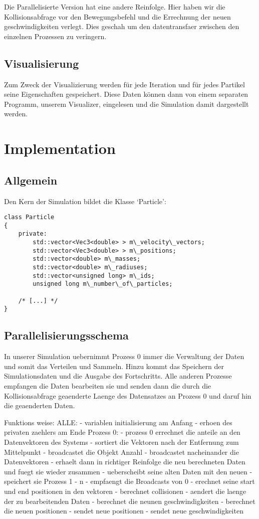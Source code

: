 Die Parallelisierte Version hat eine andere Reinfolge.
Hier haben wir die Kollisionsabfrage vor den Bewegungsbefehl und die Errechnung
der neuen geschwindigkeiten verlegt. Dies geschah um den datentransfaer zwischen
den einzelnen Prozessen zu veringern.

\subsection{Visualisierung}
Zum Zweck der Visualizierung werden für jede Iteration und für jedes Partikel seine
Eigenschaften gespeichert. Diese Daten können dann von einem separaten Programm,
unserem Visualizer, eingelesen und die Simulation damit dargestellt werden.


\section{Implementation}
\subsection{Allgemein}
Den Kern der Simulation bildet die Klasse `Particle':
\begin{verbatim}
class Particle
{
    private:
        std::vector<Vec3<double> > m\_velocity\_vectors;
        std::vector<Vec3<double> > m\_positions;
        std::vector<double> m\_masses;
        std::vector<double> m\_radiuses;
        std::vector<unsigned long> m\_ids;
        unsigned long m\_number\_of\_particles;

    /* [...] */
}
\end{verbatim}

\subsection{Parallelisierungsschema}
In unserer Simulation uebernimmt Prozess 0 immer die Verwaltung der Daten und somit das Verteilen
und Sammeln. Hinzu kommt das Speichern der Simulationsdaten und die Ausgabe des Fortschritts.
Alle anderen Prozesse empfangen die Daten bearbeiten sie und senden dann die
durch die Kollisionsabfrage geaenderte Laenge des Datensatzes an Prozess 0
und daruf hin die geaenderten Daten.

Funktions weise:
   ALLE:
       - variablen initialisierung am Anfang
       - erhoen des privaten zaehlers am Ende
   Prozess 0:
       - prozess 0 errechnet die anteile an den Datenvektoren des Systems
       - sortiert die Vektoren nach der Entfernung zum Mittelpunkt 
       - broadcastet die Objekt Anzahl
       - broadcastet nacheinander die Datenvektoren
       - erhaelt dann in richtiger Reinfolge die neu berechneten Daten und fuegt sie wieder zusammen
       - ueberscheibt seine alten Daten mit den neuen
       - speichert sie
   Prozess 1 - n
       - empfaengt die Broadcasts von 0
       - erechnet seine start und end positionen in den vektoren
       - berechnet collisionen
       - aendert die laenge der zu bearbeitenden Daten
       - berechnet die neunen geschwindigkeiten
       - berechnet die neuen positionen
       - sendet neue positionen
       - sendet neue geschwindigkeiten

